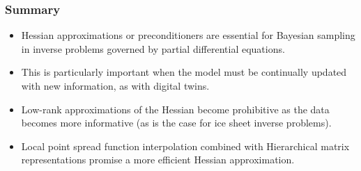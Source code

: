 \documentclass[10pt,final,xcolor=dvipsnames]{beamer}
\begin{document}





\begin{frame}
  \frametitle{Summary}

  \begin{itemize}
  	\setlength\itemsep{1.5em}
  \item Hessian approximations or preconditioners are essential for Bayesian sampling in inverse problems governed by
    partial differential equations.
    \vspace{0.05in}
  \item This is particularly important when the model must be continually updated with new information, as with digital twins.
  \item Low-rank approximations of the Hessian become
    prohibitive as the data becomes more informative (as is the case
    for ice sheet inverse problems).
    \vspace{0.05in}
  \item Local point spread function interpolation combined with Hierarchical matrix representations promise a more efficient
    Hessian approximation.
  \end{itemize}
\end{frame}
\end{document}
